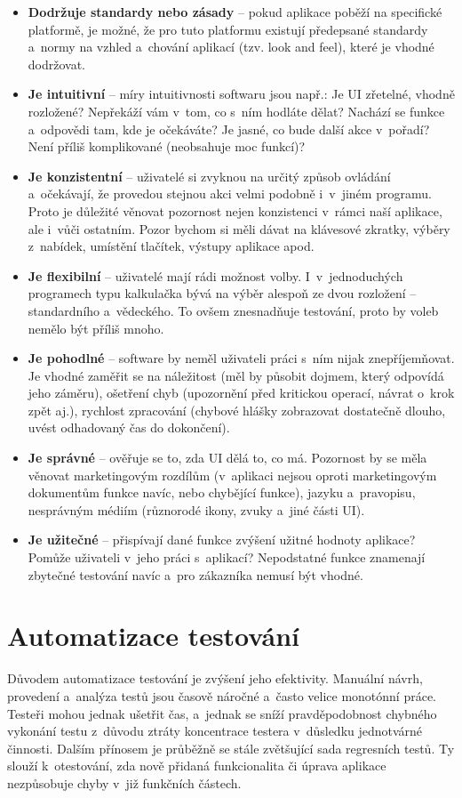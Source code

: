 			\begin{itemize}
				\item \textbf{Dodržuje standardy nebo zásady} -- pokud aplikace poběží na specifické platformě, je možné, že pro tuto platformu existují předepsané standardy a~normy na vzhled a~chování aplikací (tzv. look and feel), které je vhodné dodržovat.
				\item \textbf{Je intuitivní} -- míry intuitivnosti softwaru jsou např.: Je UI zřetelné, vhodně rozložené? Nepřekáží vám v~tom, co s~ním hodláte dělat? Nachází se funkce a~odpovědi tam, kde je očekáváte? Je jasné, co bude další akce v~pořadí? Není příliš komplikované (neobsahuje moc funkcí)?
				\item \textbf{Je konzistentní} -- uživatelé si zvyknou na určitý způsob ovládání a~očekávají, že provedou stejnou akci velmi podobně i~v~jiném programu. Proto je důležité věnovat pozornost nejen konzistenci v~rámci naší aplikace, ale i~vůči ostatním. Pozor bychom si měli dávat na klávesové zkratky, výběry z~nabídek, umístění tlačítek, výstupy aplikace apod.
				\item \textbf{Je flexibilní} -- uživatelé mají rádi možnost volby. I~v~jednoduchých programech typu kalkulačka bývá na výběr alespoň ze dvou rozložení -- standardního a~vědeckého. To ovšem znesnadňuje testování, proto by voleb nemělo být příliš mnoho.
				\item \textbf{Je pohodlné} -- software by neměl uživateli práci s~ním nijak znepříjemňovat. Je vhodné zaměřit se na náležitost (měl by působit dojmem, který odpovídá jeho záměru), ošetření chyb (upozornění před kritickou operací, návrat o~krok zpět aj.), rychlost zpracování (chybové hlášky zobrazovat dostatečně dlouho, uvést odhadovaný čas do dokončení).
				\item \textbf{Je správné} -- ověřuje se to, zda UI dělá to, co má. Pozornost by se měla věnovat marketingovým rozdílům (v~aplikaci nejsou oproti marketingovým dokumentům funkce navíc, nebo chybějící funkce), jazyku a~pravopisu, nesprávným médiím (různorodé ikony, zvuky a~jiné části UI).
				\item \textbf{Je užitečné} -- přispívají dané funkce zvýšení užitné hodnoty aplikace? Pomůže uživateli v~jeho práci s~aplikací? Nepodstatné funkce znamenají zbytečné testování navíc a~pro zákazníka nemusí být vhodné.
			\end{itemize}
		
		\section{Automatizace testování}
		Důvodem automatizace testování je zvýšení jeho efektivity. Manuální návrh, provedení a~analýza testů jsou časově náročné a~často velice monotónní práce. Testeři mohou jednak ušetřit čas, a~jednak se sníží pravděpodobnost chybného vykonání testu z~důvodu ztráty koncentrace testera v~důsledku jednotvárné činnosti. Dalším přínosem je průběžně se stále zvětšující sada regresních testů. Ty slouží k~otestování, zda nově přidaná funkcionalita či úprava aplikace nezpůsobuje chyby v~již funkčních částech.
		
